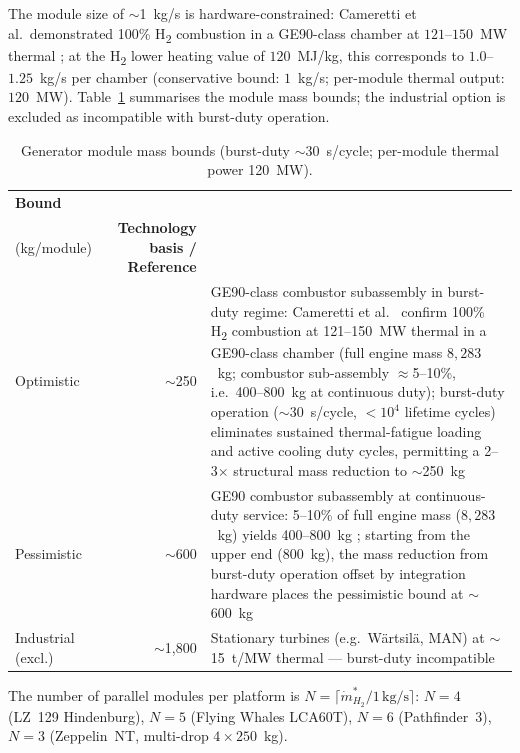 \documentclass[applsci,article,submit,pdftex,moreauthors]{Definitions/mdpi}
\newcommand{\dotmstar}{\dot{m}_{H_2}^{*}}
\begin{document}
The module size of $\sim$1~kg/s is hardware-constrained: Cameretti et al.\ demonstrated 100\% H\textsubscript{2} combustion in a GE90-class chamber at $121$--$150$~MW thermal \cite{Cameretti2025}; at the H\textsubscript{2} lower heating value of $120$~MJ/kg, this corresponds to $1.0$--$1.25$~kg/s per chamber (conservative bound: $1$~kg/s; per-module thermal output: $120$~MW). Table~\ref{tab:gen_bounds} summarises the module mass bounds; the industrial option is excluded as incompatible with burst-duty operation.

\begin{table}[H]
\centering
\footnotesize
\caption{Generator module mass bounds (burst-duty ${\sim}$30~s/cycle; per-module thermal power 120~MW).}
\label{tab:gen_bounds}
\renewcommand{\arraystretch}{1.15}
\begin{tabular}{@{} l r p{8cm} @{}}
\toprule
\textbf{Bound} & \makecell{\textbf{Module mass}\\(kg/module)} & \textbf{Technology basis / Reference} \\
\midrule
Optimistic          & $\sim$250   & GE90-class combustor subassembly in burst-duty regime: Cameretti et al.\ \cite{Cameretti2025} confirm 100\% H\textsubscript{2} combustion at 121--150~MW thermal in a GE90-class chamber (full engine mass $8{,}283$~kg; combustor sub-assembly ${\approx}$5--10\%, i.e.\ 400--800~kg at continuous duty); burst-duty operation (${\sim}$30~s/cycle, ${<}10^4$ lifetime cycles) eliminates sustained thermal-fatigue loading and active cooling duty cycles, permitting a 2--3$\times$ structural mass reduction to ${\sim}$250~kg \\
Pessimistic         & $\sim$600   & GE90 combustor subassembly at continuous-duty service: 5--10\% of full engine mass ($8{,}283$~kg) yields 400--800~kg \cite{Cameretti2025}; starting from the upper end (800~kg), the mass reduction from burst-duty operation offset by integration hardware places the pessimistic bound at ${\sim}$600~kg \\
Industrial (excl.)  & $\sim$1{,}800 & Stationary turbines (e.g.\ Wärtsilä, MAN) at ${\sim}$15~t/MW thermal --- burst-duty incompatible \\
\bottomrule
\end{tabular}
\end{table}

The number of parallel modules per platform is $N = \lceil\dotmstar / 1\,\mathrm{kg/s}\rceil$: $N = 4$ (LZ~129 Hindenburg), $N = 5$ (Flying Whales LCA60T), $N = 6$ (Pathfinder~3), $N = 3$ (Zeppelin~NT, multi-drop $4\times250$~kg).
\end{document}
